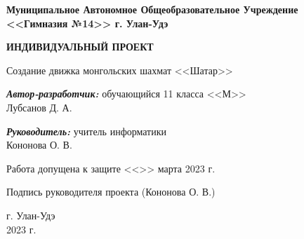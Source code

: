 \begin{titlepage}
	\begin{center}
		\textbf{ 
			Муниципальное Автономное Общеобразовательное Учреждение \\
			<<Гимназия №14>> г. Улан-Удэ
		}
		
		\vspace{4em}
		\textbf{
			ИНДИВИДУАЛЬНЫЙ ПРОЕКТ
		}
		\vspace{6em}

		Создание движка монгольских шахмат <<Шатар>>

		
	\end{center}
	\vspace{8em}
	\begin{flushright}
		
		\textbf{\textit{Автор-разработчик:}}
		обучающийся 11 класса <<М>> \\
		Лубсанов Д. А.
		
		\vspace{2em}
		
		\textbf{\textit{Руководитель:}}
		учитель информатики \\
		Кононова О. В.
		
	\end{flushright}
	
	\vspace{6em}
	
	Работа допущена к защите <<\underline{\hspace{2em}}>> марта 2023 г.
	
	\vspace{1em}
	
	Подпись руководителя проекта \hspace{1em} \hrulefill \hspace{1em}(Кононова О. В.)
	
	\vspace{4em}
	
	\begin{center}
		г. Улан-Удэ \\
		2023 г.
	\end{center}
	
	\clearpage
\end{titlepage}